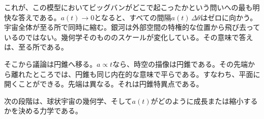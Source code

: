 これが、この模型においてビッグバンがどこで起こったかという問いへの最も明快な答えである。\(a(t)\to 0\)となると、すべての間隔\(a(t)\,\Delta\theta\)はゼロに向かう。宇宙全体が至る所で同時に縮む。銀河は外部空間の特権的な位置から飛び去っているのではない。幾何学そのもののスケールが変化している。その意味で答えは、至る所である。

\begin{classroomqa}
\end{classroomqa}

そこから議論は円錐へ移る。\(a\propto t\)なら、時空の描像は円錐である。その先端から離れたところでは、円錐も同じ内在的な意味で平らである。すなわち、平面に開くことができる。先端は異なる。それは円錐特異点である。

次の段階は、球状宇宙の幾何学、そして\(a(t)\)がどのように成長または縮小するかを決める力学である。
